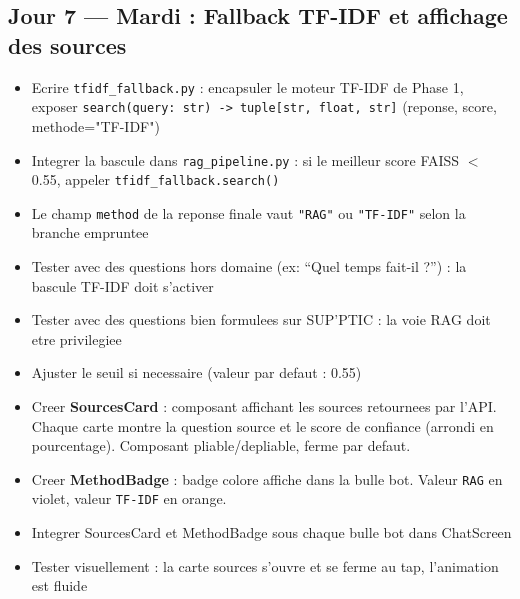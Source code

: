 \documentclass[11pt,a4paper]{article}
\begin{document}
\subsection{Jour 7 --- Mardi : Fallback TF-IDF et affichage des sources}

\begin{ragbox}[Backend --- J7]
\begin{itemize}
    \item[$\square$] Ecrire \texttt{tfidf\_fallback.py} : encapsuler le moteur TF-IDF de Phase 1, exposer \texttt{search(query: str) -> tuple[str, float, str]} (reponse, score, methode="TF-IDF")
    \item[$\square$] Integrer la bascule dans \texttt{rag\_pipeline.py} : si le meilleur score FAISS $<$ 0.55, appeler \texttt{tfidf\_fallback.search()}
    \item[$\square$] Le champ \texttt{method} de la reponse finale vaut \texttt{"RAG"} ou \texttt{"TF-IDF"} selon la branche empruntee
    \item[$\square$] Tester avec des questions hors domaine (ex: ``Quel temps fait-il ?'') : la bascule TF-IDF doit s'activer
    \item[$\square$] Tester avec des questions bien formulees sur SUP'PTIC : la voie RAG doit etre privilegiee
    \item[$\square$] Ajuster le seuil si necessaire (valeur par defaut : 0.55)
\end{itemize}
\end{ragbox}

\begin{reactbox}[Frontend --- J7]
\begin{itemize}
    \item[$\square$] Creer \textbf{SourcesCard} : composant affichant les sources retournees par l'API. Chaque carte montre la question source et le score de confiance (arrondi en pourcentage). Composant pliable/depliable, ferme par defaut.
    \item[$\square$] Creer \textbf{MethodBadge} : badge colore affiche dans la bulle bot. Valeur \texttt{RAG} en violet, valeur \texttt{TF-IDF} en orange.
    \item[$\square$] Integrer SourcesCard et MethodBadge sous chaque bulle bot dans ChatScreen
    \item[$\square$] Tester visuellement : la carte sources s'ouvre et se ferme au tap, l'animation est fluide
\end{itemize}
\end{reactbox}
\end{document}
